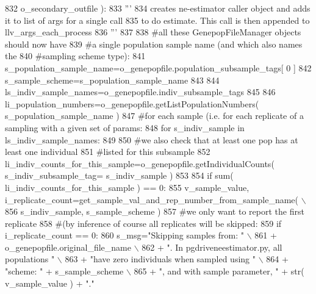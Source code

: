 \begin{DoxyCode}
832                         o\_secondary\_outfile ):
833     \textcolor{stringliteral}{'''     }
834 \textcolor{stringliteral}{    creates ne-estimator caller object and adds it to list of args for a single call}
835 \textcolor{stringliteral}{    to do estimate.  This call is then appended to llv\_args\_each\_process}
836 \textcolor{stringliteral}{    '''}
837 
838     \textcolor{comment}{#all these GenepopFileManager objects should now have}
839     \textcolor{comment}{#a single population sample name (and which also names the }
840     \textcolor{comment}{#sampling scheme type):}
841     s\_population\_sample\_name=o\_genepopfile.population\_subsample\_tags[ 0 ]
842     s\_sample\_scheme=s\_population\_sample\_name
843 
844     ls\_indiv\_sample\_names=o\_genepopfile.indiv\_subsample\_tags
845 
846     li\_population\_numbers=o\_genepopfile.getListPopulationNumbers( s\_population\_sample\_name )
847     \textcolor{comment}{#for each sample (i.e. for each replicate of a sampling with a given set of params:}
848     \textcolor{keywordflow}{for} s\_indiv\_sample \textcolor{keywordflow}{in} ls\_indiv\_sample\_names:
849 
850         \textcolor{comment}{#we also check that at least one pop has at least one individual}
851         \textcolor{comment}{#listed for this subsample}
852         li\_indiv\_counts\_for\_this\_sample=o\_genepopfile.getIndividualCounts( s\_indiv\_subsample\_tag=
      s\_indiv\_sample )
853     
854         \textcolor{keywordflow}{if} sum( li\_indiv\_counts\_for\_this\_sample ) == 0:
855             v\_sample\_value, i\_replicate\_count=get\_sample\_val\_and\_rep\_number\_from\_sample\_name( \(\backslash\)
856                                             s\_indiv\_sample, s\_sample\_scheme )
857             \textcolor{comment}{#we only want to report the first replicate}
858             \textcolor{comment}{#(by inference of course all replicates will be skipped:}
859             \textcolor{keywordflow}{if} i\_replicate\_count == 0:
860                 s\_msg=\textcolor{stringliteral}{"Skipping samples from: "} \(\backslash\)
861                         + o\_genepopfile.original\_file\_name \(\backslash\)
862                         + \textcolor{stringliteral}{".  In pgdriveneestimator.py, all populations "} \(\backslash\)
863                         + \textcolor{stringliteral}{"have zero individuals when sampled using "} \(\backslash\)
864                         + \textcolor{stringliteral}{"scheme: "} + s\_sample\_scheme \(\backslash\)
865                         + \textcolor{stringliteral}{", and with sample parameter, "} + str( v\_sample\_value ) + \textcolor{stringliteral}{"."}

\end{DoxyCode}
